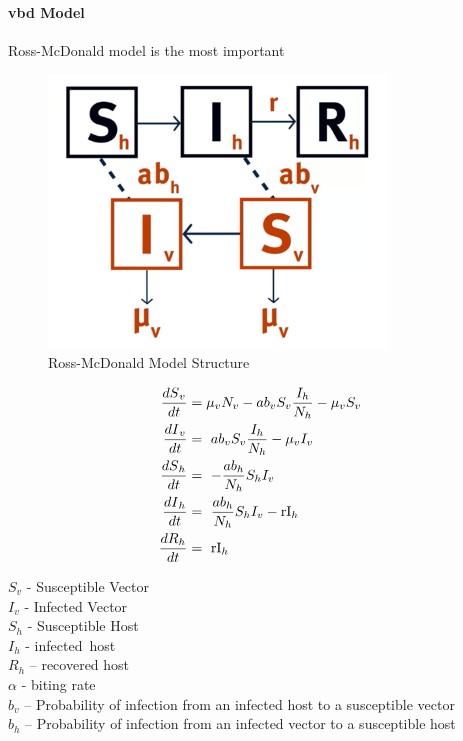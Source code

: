 \documentclass[a4paper, 12pt, twoside]{article}
\begin{document}
\paragraph{\gls{vbd} Model}
Ross-McDonald model is the most important 

\begin{figure}[htpb]
  \centering
  \includegraphics[width=0.8\textwidth]{ross-mcdonald}
  \caption{Ross-McDonald Model Structure}
  \label{fig:ross-mcdonald}
\end{figure}

\begin{align}
  \frac{{dS}_v}{dt} & = \mu_v N_v - ab_vS_v\frac{I_h}{N_h} - \mu_v S_v \\
  \frac{{dI}_v}{dt} & =\ ab_vS_v\frac{I_h}{N_h}-\mu_v I_v \\
  \frac{{dS}_h}{dt} & =\ -\frac{ab_h}{N_h}S_hI_v \\
  \frac{{dI}_h}{dt} & =\ \frac{ab_h}{N_h}S_hI_v-{\rm rI}_h \\
  \frac{{dR}_h}{dt} & =\ {\rm rI}_h 
\end{align}
\begin{centering}
$S_v$ - Susceptible Vector  \\
$I_v$ - Infected Vector\\
$S_h$ - Susceptible Host\\
$I_h$ - infected\ host\\
$R_h$ – recovered host\\
$\alpha$ - biting rate \\
$b_v$ – Probability of infection from an infected host to a susceptible vector\\
$b_h$ – Probability of infection from an infected vector to a susceptible host
\end{centering}
\end{document}
